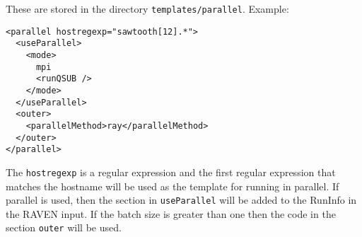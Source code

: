 These are stored in the directory \texttt{templates/parallel}. Example:

\begin{lstlisting}[style=XML]
<parallel hostregexp="sawtooth[12].*">
  <useParallel>
    <mode>
      mpi
      <runQSUB />
    </mode>
  </useParallel>
  <outer>
    <parallelMethod>ray</parallelMethod>
  </outer>
</parallel>
\end{lstlisting}

The \texttt{hostregexp} is a regular expression and the first regular
expression that matches the hostname will be used as the template for
running in parallel.  If parallel is used, then the section in
\texttt{useParallel} will be added to the RunInfo in the RAVEN
input. If the batch size is greater than one then the code in the
section \texttt{outer} will be used.
